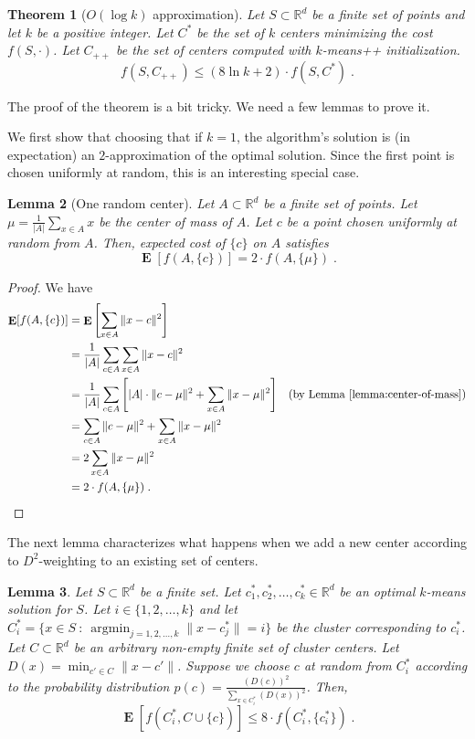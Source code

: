 \documentclass[9pt]{article}
\newtheorem{lemma}{Lemma}
\newtheorem{theorem}[lemma]{Theorem}
\newcommand{\R}{\mathbb{R}}
\newcommand{\norm}[1]{\|{#1}\|}
\DeclareMathOperator*{\argmin}{argmin}
\DeclareMathOperator*{\Exp}{\mathbf{E}}
\begin{document}
\begin{theorem}[$O(\log k)$ approximation]
\label{theorem:main}
Let $S \subset \R^d$ be a finite set of points and let $k$ be a positive integer.
Let $C^*$ be the set of $k$ centers minimizing the cost $f(S,\cdot)$.
Let $C_{++}$ be the set of centers computed with $k$-means++ initialization.
$$
f(S, C_{++}) \le (8 \ln k + 2) \cdot f(S, C^*) \; .
$$
\end{theorem}

The proof of the theorem is a bit tricky. We need a few lemmas to prove it.

We first show that choosing that if $k=1$, the algorithm's solution is (in
expectation) an $2$-approximation of the optimal solution. Since the first point
is chosen uniformly at random, this is an interesting special case.

\begin{lemma}[One random center]
\label{lemma:one-random-center}
Let $A \subset \R^d$ be a finite set of points. Let $\mu = \frac{1}{|A|} \sum_{x \in A} x$
be the center of mass of $A$. Let $c$ be a point chosen uniformly at random from $A$. Then,
expected cost of $\{c\}$ on $A$ satisfies
$$
\Exp[f(A,\{c\})] = 2 \cdot f(A, \{\mu\}) \; .
$$
\end{lemma}

\begin{proof}
We have
\begin{align*}
\Exp[f(A,\{c\})]
& = \Exp\left[\sum_{x \in A} \norm{x - c}^2\right] \\
& = \frac{1}{|A|} \sum_{c \in A} \sum_{x \in A} \norm{x - c}^2 \\
& = \frac{1}{|A|} \sum_{c \in A} \left[ |A| \cdot \norm{c - \mu}^2 + \sum_{x \in A} \norm{x - \mu}^2 \right] & \text{(by Lemma~\ref{lemma:center-of-mass})} \\
& = \sum_{c \in A} \norm{c - \mu}^2 + \sum_{x \in A} \norm{x - \mu}^2 \\
& = 2 \sum_{x \in A} \norm{x - \mu}^2 \\
& = 2 \cdot f(A, \{\mu\}) \; .
\end{align*}
\end{proof}

The next lemma characterizes what happens when we add a new center
according to $D^2$-weighting to an existing set of centers.

\begin{lemma}
Let $S \subset \R^d$ be a finite set. Let $c^*_1, c^*_2, \dots, c^*_k \in \R^d$
be an optimal $k$-means solution for $S$. Let $i \in \{1,2,\dots,k\}$ and
let $C^*_i = \{ x \in S ~:~
\argmin_{j=1,2,\dots,k} \norm{x - c_j^*} = i\}$ be the cluster corresponding to
$c^*_i$. Let $C \subset \R^d$ be an arbitrary non-empty finite set of cluster centers.
Let $D(x) = \min_{c' \in C} \norm{x - c'}$. Suppose we
choose $c$ at random from $C^*_i$ according to the probability distribution $p(c) =
\frac{(D(c))^2}{\sum_{x \in C_i^*} (D(x))^2}$. Then,
$$
\Exp[f(C_i^*, C \cup \{c\})] \le 8 \cdot f(C^*_i, \{c^*_i\}) \; .
$$
\end{lemma}
\end{document}
